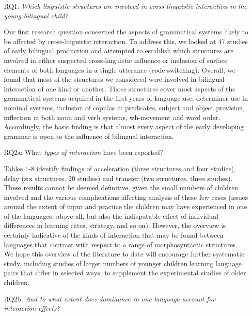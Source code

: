 \documentclass[output=paper]{langscibook}
\begin{document}
RQ1: \textit{Which linguistic structures are involved in cross-linguistic interaction in the young bilingual child?}

Our first research question concerned the aspects of grammatical systems likely to be affected by cross-linguistic interaction. To address this, we looked at 47 studies of early bilingual production and attempted to establish which structures are involved in either suspected cross-linguistic influence or inclusion of surface elements of both languages in a single utterance (code-switching). Overall, we found that most of the structures we considered were involved in bilingual interaction of one kind or another. Those structures cover most aspects of the grammatical systems acquired in the first years of language use: determiner use in nominal systems, inclusion of copulas in predicates, subject and object provision, inflection in both noun and verb systems, wh-movement and word order. Accordingly, the basic finding is that almost every aspect of the early developing grammar is open to the influence of bilingual interaction.

RQ2a: What \textit{types of interaction} have been reported?

Tables 1-8 identify findings of acceleration (three structures and four studies), delay (six structures, 20 studies) and transfer (two structures, three studies). These results cannot be deemed definitive, given the small numbers of children involved and the various complications affecting analysis of these few cases (issues around the extent of input and practice the children may have experienced in one of the languages, above all, but also the indisputable effect of individual differences in learning rates, strategy, and so on). However, the overview is certainly indicative of the kinds of interaction that may be found between languages that contrast with respect to a range of morphosyntactic structures. We hope this overview of the literature to date will encourage further systematic study, including studies of larger numbers of younger children learning language pairs that differ in selected ways, to supplement the experimental studies of older children.

RQ2b: \textit{And to what extent does dominance in one language account for interaction effects?} 
\end{document}
